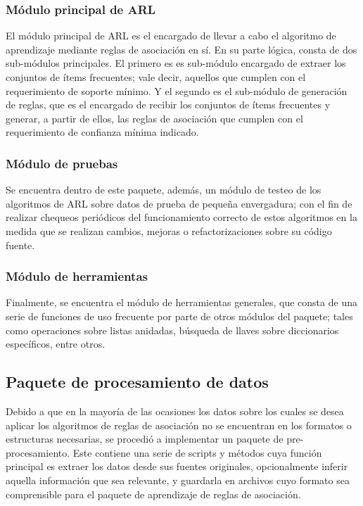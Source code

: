 \subsubsection{Módulo principal de ARL}

El módulo principal de ARL es el encargado de llevar a cabo el algoritmo de aprendizaje mediante reglas de asociación en sí. En su parte lógica, consta de dos sub-módulos principales. El primero es es sub-módulo encargado de extraer los conjuntos de ítems frecuentes; vale decir, aquellos que cumplen con el requerimiento de soporte mínimo. Y el segundo es el sub-módulo de generación de reglas, que es el encargado de recibir los conjuntos de ítems frecuentes y generar, a partir de ellos, las reglas de asociación que cumplen con el requerimiento de confianza mínima indicado.

\subsubsection{Módulo de pruebas}

Se encuentra dentro de este paquete, además, un módulo de testeo de los algoritmos de ARL sobre datos de prueba de pequeña envergadura; con el fin de realizar chequeos periódicos del funcionamiento correcto de estos algoritmos en la medida que se realizan cambios, mejoras o refactorizaciones sobre su código fuente.

\subsubsection{Módulo de herramientas}

Finalmente, se encuentra el módulo de herramientas generales, que consta de una serie de funciones de uso frecuente por parte de otros módulos del paquete; tales como operaciones sobre listas anidadas, búsqueda de llaves sobre diccionarios específicos, entre otros.

\subsection{Paquete de procesamiento de datos}

Debido a que en la mayoría de las ocasiones los datos sobre los cuales se desea aplicar los algoritmos de reglas de asociación no se encuentran en los formatos o estructuras necesarias, se procedió a implementar un paquete de pre-procesamiento. Este contiene una serie de scripts y métodos cuya función principal es extraer los datos desde sus fuentes originales, opcionalmente inferir aquella información que sea relevante, y guardarla en archivos cuyo formato sea comprensible para el paquete de aprendizaje de reglas de asociación.

